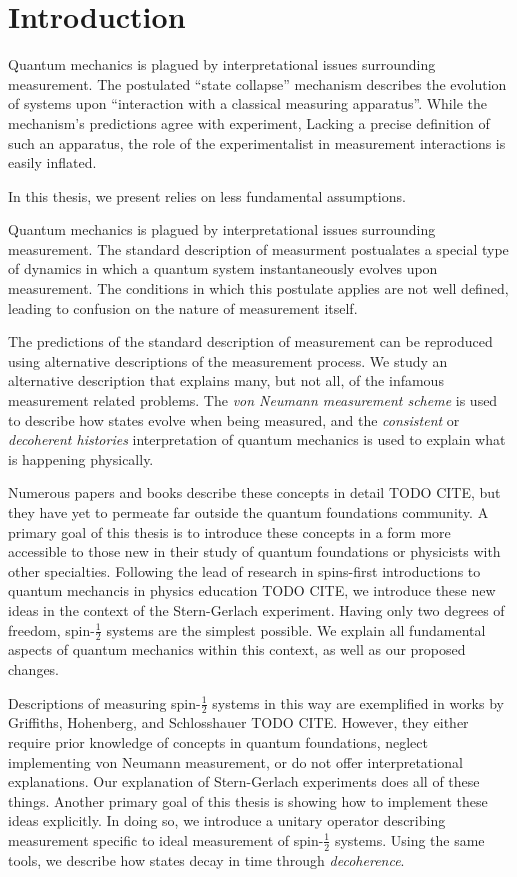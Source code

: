 \chapter{Introduction}

Quantum mechanics is plagued by interpretational issues surrounding measurement. The postulated ``state collapse'' mechanism describes the evolution of systems upon ``interaction with a classical measuring apparatus''. While the mechanism's predictions agree with experiment,   Lacking a precise definition of such an apparatus, the role of the experimentalist in measurement interactions is easily inflated.

In this thesis, we present relies on less fundamental assumptions.

Quantum mechanics is plagued by interpretational issues surrounding measurement. The
standard description of measurment postualates a special type of dynamics in which a quantum system instantaneously evolves upon measurement. The conditions in which this postulate applies are not well defined, leading to confusion on the nature of measurement itself.

The predictions of the standard description of measurement can be reproduced using alternative
descriptions of the measurement process. We study an alternative description that explains many, but not all,  of the infamous measurement related problems. The \textit{von Neumann measurement scheme} is used to describe how states evolve when being measured, and the \textit{consistent} or \textit{decoherent histories} interpretation of quantum mechanics is used to explain what is happening physically.

Numerous papers and books describe these concepts in detail TODO CITE, but they have yet to permeate
far outside the quantum foundations community. A primary goal of this thesis is to introduce
these concepts in a form more accessible to those new in their study of quantum foundations or physicists with other specialties. Following the lead of research in spins-first introductions to quantum mechancis in physics education TODO CITE, we introduce these new ideas in the context of the Stern-Gerlach experiment. Having only two degrees of freedom, spin-$\frac{1}{2}$ systems are the simplest possible. We explain all fundamental aspects of quantum mechanics within this context, as well as our proposed changes.

Descriptions of measuring spin-$\frac{1}{2}$ systems in this way are exemplified
in works by Griffiths, Hohenberg, and Schlosshauer TODO CITE. However, they either require prior knowledge
of concepts in quantum foundations, neglect implementing von Neumann measurement, or do not offer interpretational explanations. Our explanation of Stern-Gerlach experiments does all of these things. Another primary goal of this thesis is showing how to implement these ideas explicitly. In doing so, we introduce a  unitary operator describing measurement specific to ideal measurement of spin-$\frac{1}{2}$ systems. Using the same tools, we describe how states decay in time through \textit{decoherence}.

